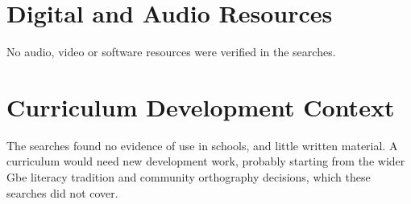 \documentclass[12pt]{article}
\begin{document}
\section{Digital and Audio Resources}
No audio, video or software resources were verified in the searches.

\section{Curriculum Development Context}
The searches found no evidence of use in schools, and little written material. A curriculum would need new development work, probably starting from the wider Gbe literacy tradition and community orthography decisions, which these searches did not cover.
\end{document}
